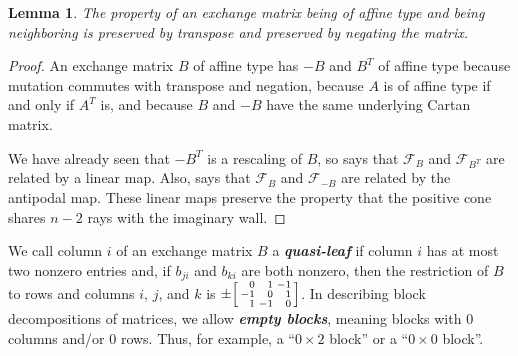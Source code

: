 \documentclass[10pt]{article}
\newtheorem{lemma}[proposition]{Lemma}
\theoremstyle{definition}
\theoremstyle{remark}
\numberwithin{equation}{section}
\newcommand{\newword}[1]{\textbf{\emph{#1}}}
\newcommand{\F}{{\mathcal F}}
\newcommand{\0}{{\mathbf{0}}}
\begin{document}
\begin{lemma}\label{neigh neg and T}
The property of an exchange matrix being of affine type and being neighboring is preserved by transpose and preserved by negating the matrix.
\end{lemma}
\begin{proof}
An exchange matrix $B$ of affine type has $-B$ and $B^T$ of affine type because mutation commutes with transpose and negation, because $A$ is of affine type if and only if $A^T$ is, and because $B$ and $-B$ have the same underlying Cartan matrix.

We have already seen that $-B^T$ is a rescaling of $B$, so \cite[Proposition~7.8(3)]{universal} says that $\F_B$ and $\F_{B^T}$ are related by a linear map.
Also, \cite[Proposition~7.1]{universal} says that $\F_B$ and $\F_{-B}$ are related by the antipodal map.
These linear maps preserve the property that the positive cone shares $n-2$ rays with the imaginary wall.
\end{proof}

We call column $i$ of an exchange matrix $B$ a \newword{quasi-leaf} if column $i$ has at most two nonzero entries and, if $b_{ji}$ and $b_{ki}$ are both nonzero, then the restriction of $B$ to rows and columns $i$, $j$, and $k$ is $\pm\begin{bsmallmatrix*}[r]0&1&-1\\-1&0&1\\1&-1&0\end{bsmallmatrix*}$.
In describing block decompositions of matrices, we allow \newword{empty blocks}, meaning blocks with $0$ columns and/or $0$ rows.
Thus, for example, a ``$0\times 2$ block'' or a ``$0\times 0$ block''.
\end{document}
